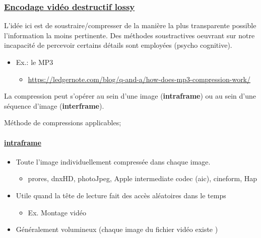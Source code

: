 \documentclass[
  french,
]{book}
\providecommand{\tightlist}{%
  \setlength{\itemsep}{0pt}\setlength{\parskip}{0pt}}
\begin{document}
\hypertarget{encodage-viduxe9o-destructif-lossy}{%
\subsubsection{\texorpdfstring{\href{https://en.wikipedia.org/wiki/List_of_codecs\#Lossy_compression_2}{Encodage vidéo destructif \textbf{lossy}}}{Encodage vidéo destructif lossy}}\label{encodage-viduxe9o-destructif-lossy}}

L'idée ici est de soustraire/compresser de la manière la plus transparente possible l'information la moins pertinente.
Des méthodes soustractives oeuvrant sur notre incapacité de percevoir certains détails sont employées (psycho cognitive).

\begin{itemize}
\tightlist
\item
  Ex.: le MP3

  \begin{itemize}
  \tightlist
  \item
    \url{https://ledgernote.com/blog/q-and-a/how-does-mp3-compression-work/}
  \end{itemize}
\end{itemize}

La compression peut s'opérer au sein d'une image (\textbf{intraframe}) ou au sein d'une séquence d'image (\textbf{interframe}).

Méthode de compressions applicables;

\hypertarget{intraframe}{%
\paragraph{\texorpdfstring{\href{http://users.cs.cf.ac.uk/Dave.Marshall/Multimedia/node248.html}{intraframe}}{intraframe}}\label{intraframe}}

\begin{itemize}
\tightlist
\item
  Toute l'image individuellement compressée dans chaque image.

  \begin{itemize}
  \tightlist
  \item
    prores, dnxHD, photoJpeg, Apple intermediate codec (aic), cineform, Hap\\
  \end{itemize}
\item
  Utile quand la tête de lecture fait des accès aléatoires dans le temps

  \begin{itemize}
  \tightlist
  \item
    Ex. Montage vidéo
  \end{itemize}
\item
  Généralement volumineux (chaque image du fichier vidéo existe )
\end{itemize}
\end{document}
